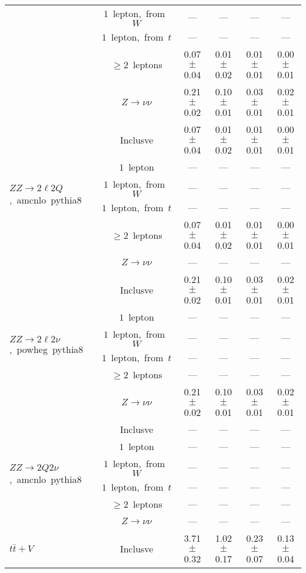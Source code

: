 \documentclass{article}
\begin{document}
\begin{longtable}{|l|c|c|c|c|c|}
 & $1$~lepton,~from~$W$  & ---  & ---  & ---  & --- \\* 
 & $1$~lepton,~from~$t$  & ---  & ---  & ---  & --- \\* 
 & $\ge2$~leptons  & 0.07 $\pm$ 0.04  & 0.01 $\pm$ 0.02  & 0.01 $\pm$ 0.01  & 0.00 $\pm$ 0.01 \\* 
 & $Z\rightarrow\nu\nu$  & 0.21 $\pm$ 0.02  & 0.10 $\pm$ 0.01  & 0.03 $\pm$ 0.01  & 0.02 $\pm$ 0.01 \\* 
\hline 
\multirow{6}{*}{$ZZ{\rightarrow}2{\ell}2Q$,~amcnlo~pythia8} & Inclusve  & 0.07 $\pm$ 0.04  & 0.01 $\pm$ 0.02  & 0.01 $\pm$ 0.01  & 0.00 $\pm$ 0.01 \\* 
 & $1$~lepton  & ---  & ---  & ---  & --- \\* 
 & $1$~lepton,~from~$W$  & ---  & ---  & ---  & --- \\* 
 & $1$~lepton,~from~$t$  & ---  & ---  & ---  & --- \\* 
 & $\ge2$~leptons  & 0.07 $\pm$ 0.04  & 0.01 $\pm$ 0.02  & 0.01 $\pm$ 0.01  & 0.00 $\pm$ 0.01 \\* 
 & $Z\rightarrow\nu\nu$  & ---  & ---  & ---  & --- \\* 
\hline 
\multirow{6}{*}{$ZZ{\rightarrow}2{\ell}2{\nu}$,~powheg~pythia8} & Inclusve  & 0.21 $\pm$ 0.02  & 0.10 $\pm$ 0.01  & 0.03 $\pm$ 0.01  & 0.02 $\pm$ 0.01 \\* 
 & $1$~lepton  & ---  & ---  & ---  & --- \\* 
 & $1$~lepton,~from~$W$  & ---  & ---  & ---  & --- \\* 
 & $1$~lepton,~from~$t$  & ---  & ---  & ---  & --- \\* 
 & $\ge2$~leptons  & ---  & ---  & ---  & --- \\* 
 & $Z\rightarrow\nu\nu$  & 0.21 $\pm$ 0.02  & 0.10 $\pm$ 0.01  & 0.03 $\pm$ 0.01  & 0.02 $\pm$ 0.01 \\* 
\hline 
\multirow{6}{*}{$ZZ{\rightarrow}2Q2{\nu}$,~amcnlo~pythia8} & Inclusve  & ---  & ---  & ---  & --- \\* 
 & $1$~lepton  & ---  & ---  & ---  & --- \\* 
 & $1$~lepton,~from~$W$  & ---  & ---  & ---  & --- \\* 
 & $1$~lepton,~from~$t$  & ---  & ---  & ---  & --- \\* 
 & $\ge2$~leptons  & ---  & ---  & ---  & --- \\* 
 & $Z\rightarrow\nu\nu$  & ---  & ---  & ---  & --- \\* 
\hline 
\multirow{6}{*}{$t\bar{t}+V$} & Inclusve  & 3.71 $\pm$ 0.32  & 1.02 $\pm$ 0.17  & 0.23 $\pm$ 0.07  & 0.13 $\pm$ 0.04 \\* 

\end{longtable}
\end{document}

